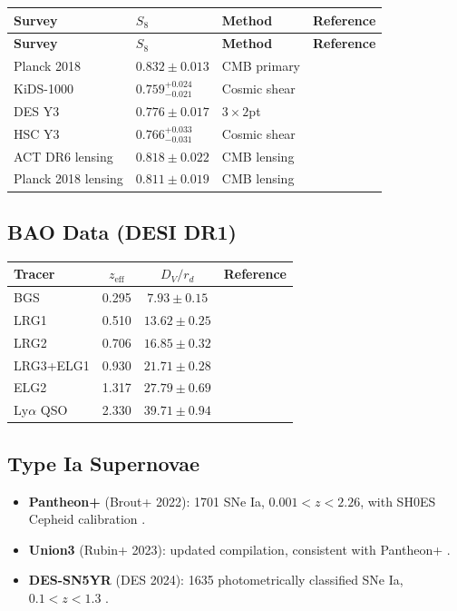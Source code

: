 \documentclass[11pt,a4paper]{article}
\theoremstyle{plain}
\theoremstyle{definition}
\theoremstyle{remark}
\begin{document}
\begin{longtable}{llll}
\toprule
\textbf{Survey} & $S_8$ & \textbf{Method} & \textbf{Reference} \\
\midrule
\endfirsthead
\toprule
\textbf{Survey} & $S_8$ & \textbf{Method} & \textbf{Reference} \\
\midrule
\endhead
Planck 2018 & $0.832 \pm 0.013$ & CMB primary & \cite{Planck18VI} \\
KiDS-1000 & $0.759^{+0.024}_{-0.021}$ & Cosmic shear & \cite{KiDS1000} \\
DES Y3 & $0.776 \pm 0.017$ & $3\times 2$pt & \cite{DESY3} \\
HSC Y3 & $0.766^{+0.033}_{-0.031}$ & Cosmic shear & \cite{HSC23} \\
ACT DR6 lensing & $0.818 \pm 0.022$ & CMB lensing & \cite{ACT23} \\
Planck 2018 lensing & $0.811 \pm 0.019$ & CMB lensing & \cite{Planck18VIII} \\
\bottomrule
\end{longtable}

\subsection{BAO Data (DESI DR1)}

\begin{center}
\begin{tabular}{lccc}
\toprule
\textbf{Tracer} & $z_{\mathrm{eff}}$ & $D_V/r_d$ & \textbf{Reference} \\
\midrule
BGS & 0.295 & $7.93 \pm 0.15$ & \cite{DESI24} \\
LRG1 & 0.510 & $13.62 \pm 0.25$ & \cite{DESI24} \\
LRG2 & 0.706 & $16.85 \pm 0.32$ & \cite{DESI24} \\
LRG3+ELG1 & 0.930 & $21.71 \pm 0.28$ & \cite{DESI24} \\
ELG2 & 1.317 & $27.79 \pm 0.69$ & \cite{DESI24} \\
Ly$\alpha$ QSO & 2.330 & $39.71 \pm 0.94$ & \cite{DESI24} \\
\bottomrule
\end{tabular}
\end{center}

\subsection{Type Ia Supernovae}

\begin{itemize}[nosep]
  \item \textbf{Pantheon+} (Brout+ 2022): 1701 SNe Ia, $0.001 < z < 2.26$,
    with SH0ES Cepheid calibration \cite{Brout22}.
  \item \textbf{Union3} (Rubin+ 2023): updated compilation, consistent
    with Pantheon+ \cite{Rubin23}.
  \item \textbf{DES-SN5YR} (DES 2024): 1635 photometrically classified
    SNe Ia, $0.1 < z < 1.3$ \cite{DES5YR}.
\end{itemize}
\end{document}

